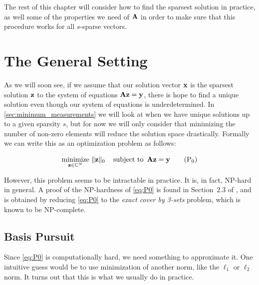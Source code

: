 The rest of this chapter will consider how to find the sparsest solution in practice, as well some of the properties we need of $ \mathbf{A} $ in order to make sure that this procedure works for all $ s $-sparse vectors. 







\section{The General Setting}
As we will soon see, if we assume that our solution vector $ \mathbf{x} $ is the sparsest solution $ \mathbf{z} $ to the system of equations $ \mathbf{A}\mathbf{z} = \mathbf{y} $, there is hope to find a unique solution even though our system of equations is underdetermined. In \cref{sec:minimum_measurements} we will look at when we have unique solutions up to a given sparsity $ s $, but for now we will only consider that minimizing the number of non-zero elements will reduce the solution space drastically. Formally we can write this as an optimization problem as follows:

\begin{equation}
	\underset{\mathbf{z} \in \mathbb{C}^{N}}{\text{minimize}}~ \lVert\mathbf{z}\rVert_0
	\quad\operatorname*{subject~to}~ \mathbf{A}\mathbf{z} = \mathbf{y}
	\tag{P$_0$}
	\label{eq:P0}
\end{equation}

\noindent However, this problem seems to be intractable in practice. It is, in fact, NP-hard in general. A proof of the NP-hardness of \eqref{eq:P0} is found in Section~2.3 of \cite{foucart13intro}, and is obtained by reducing \eqref{eq:P0} to the \textit{exact cover by 3-sets} problem, which is known to be NP-complete.





\subsection{Basis Pursuit}
Since \eqref{eq:P0} is computationally hard, we need something to approximate it. One intuitive guess would be to use minimization of another norm, like the $ \ell_{1} $ or $ \ell_{2} $ norm. It turns out that this is what we usually do in practice. 

